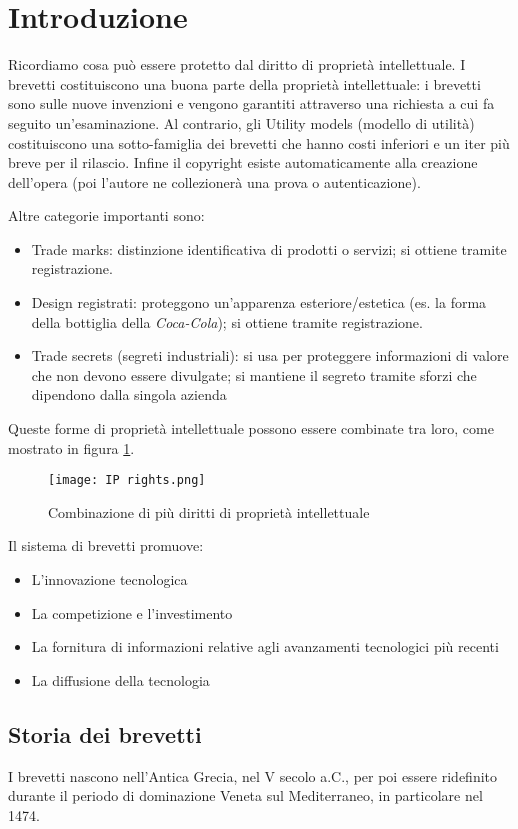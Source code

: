 \section{Introduzione}
Ricordiamo cosa può essere protetto dal diritto di proprietà intellettuale.\bigskip
I brevetti costituiscono una buona parte della proprietà intellettuale: i brevetti sono sulle nuove invenzioni e vengono garantiti attraverso una richiesta a cui fa seguito un'esaminazione.
Al contrario, gli Utility models (modello di utilità) costituiscono una sotto-famiglia dei brevetti che hanno costi inferiori e un iter più breve per il rilascio.
Infine il copyright esiste automaticamente alla creazione dell'opera (poi l'autore ne collezionerà una prova o autenticazione).

Altre categorie importanti sono: 
\begin{itemize}
    \item Trade marks: distinzione identificativa di prodotti o servizi; si ottiene tramite registrazione.
    \item Design registrati: proteggono un'apparenza esteriore/estetica (es. la forma della bottiglia della \textit{Coca-Cola}); si ottiene tramite registrazione.
    \item Trade secrets (segreti industriali): si usa per proteggere informazioni di valore che non devono essere divulgate; si mantiene il segreto tramite sforzi che dipendono dalla singola azienda
\end{itemize}

Queste forme di proprietà intellettuale possono essere combinate tra loro, come mostrato in figura \ref{IP rights}. 

\begin{figure}
    \centering
    \texttt{[image: IP rights.png]}
    \caption{Combinazione di più diritti di proprietà intellettuale}
    \label{IP rights}
\end{figure}

Il sistema di brevetti promuove:
\begin{itemize}
    \item L'innovazione tecnologica
    \item La competizione e l'investimento
    \item La fornitura di informazioni relative agli avanzamenti tecnologici più recenti
    \item La diffusione della tecnologia
\end{itemize}

\subsection{Storia dei brevetti}
I brevetti nascono nell'Antica Grecia, nel V secolo a.C., per poi essere ridefinito durante il periodo di dominazione Veneta sul Mediterraneo, in particolare nel 1474.

